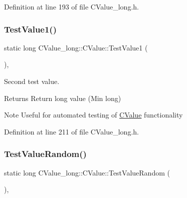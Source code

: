Definition at line 193 of file C\+Value\+\_\+long.\+h.

\mbox{\label{class_c_value__long_1_1_c_value_ae882def98abbc6eb503aa372cc4566f3}} 
\subsubsection{\texorpdfstring{Test\+Value1()}{TestValue1()}}
{\footnotesize\ttfamily static long C\+Value\+\_\+long\+::\+C\+Value\+::\+Test\+Value1 (\begin{DoxyParamCaption}{ }\end{DoxyParamCaption})\hspace{0.3cm}{\ttfamily [inline]}, {\ttfamily [static]}}



Second test value. 

\begin{DoxyReturn}{Returns}
Return {\ttfamily long} value ({\ttfamily Min} long) 
\end{DoxyReturn}
\begin{DoxyNote}{Note}
Useful for automated testing of \hyperlink{class_c_value__long_1_1_c_value}{C\+Value} functionality 
\end{DoxyNote}


Definition at line 211 of file C\+Value\+\_\+long.\+h.

\mbox{\label{class_c_value__long_1_1_c_value_af2f5fc69991e114e1632776d77224e69}} 
\subsubsection{\texorpdfstring{Test\+Value\+Random()}{TestValueRandom()}}
{\footnotesize\ttfamily static long C\+Value\+\_\+long\+::\+C\+Value\+::\+Test\+Value\+Random (\begin{DoxyParamCaption}{ }\end{DoxyParamCaption})\hspace{0.3cm}{\ttfamily [inline]}, {\ttfamily [static]}}



